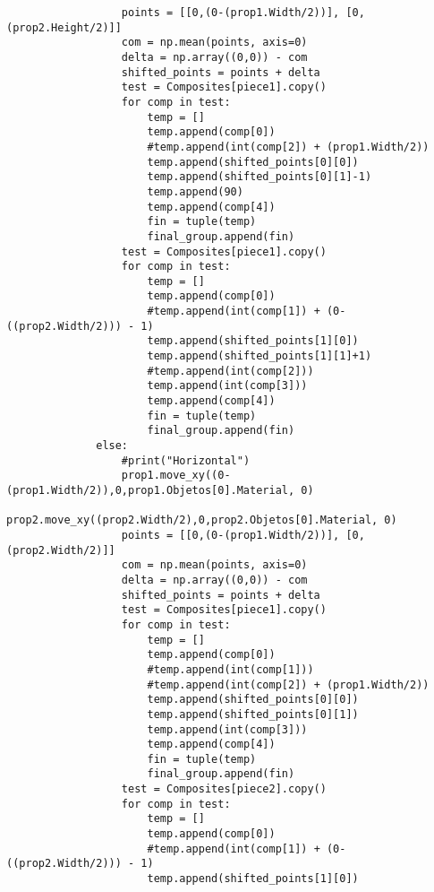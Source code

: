 \begin{verbatim}
                  points = [[0,(0-(prop1.Width/2))], [0,(prop2.Height/2)]]
                  com = np.mean(points, axis=0)
                  delta = np.array((0,0)) - com
                  shifted_points = points + delta
                  test = Composites[piece1].copy()
                  for comp in test:
                      temp = []
                      temp.append(comp[0])
                      #temp.append(int(comp[2]) + (prop1.Width/2))
                      temp.append(shifted_points[0][0])
                      temp.append(shifted_points[0][1]-1)
                      temp.append(90)
                      temp.append(comp[4])
                      fin = tuple(temp)
                      final_group.append(fin)
                  test = Composites[piece1].copy()
                  for comp in test:
                      temp = []
                      temp.append(comp[0])
                      #temp.append(int(comp[1]) + (0-((prop2.Width/2))) - 1)
                      temp.append(shifted_points[1][0])
                      temp.append(shifted_points[1][1]+1)
                      #temp.append(int(comp[2]))
                      temp.append(int(comp[3]))
                      temp.append(comp[4])
                      fin = tuple(temp)
                      final_group.append(fin)
              else:
                  #print("Horizontal")
                  prop1.move_xy((0-(prop1.Width/2)),0,prop1.Objetos[0].Material, 0)
                  prop2.move_xy((prop2.Width/2),0,prop2.Objetos[0].Material, 0)
                  points = [[0,(0-(prop1.Width/2))], [0,(prop2.Width/2)]]
                  com = np.mean(points, axis=0)
                  delta = np.array((0,0)) - com
                  shifted_points = points + delta
                  test = Composites[piece1].copy()
                  for comp in test:
                      temp = []
                      temp.append(comp[0])
                      #temp.append(int(comp[1]))
                      #temp.append(int(comp[2]) + (prop1.Width/2))
                      temp.append(shifted_points[0][0])
                      temp.append(shifted_points[0][1])
                      temp.append(int(comp[3]))
                      temp.append(comp[4])
                      fin = tuple(temp)
                      final_group.append(fin)
                  test = Composites[piece2].copy()
                  for comp in test:
                      temp = []
                      temp.append(comp[0])
                      #temp.append(int(comp[1]) + (0-((prop2.Width/2))) - 1)
                      temp.append(shifted_points[1][0])

\end{verbatim}
